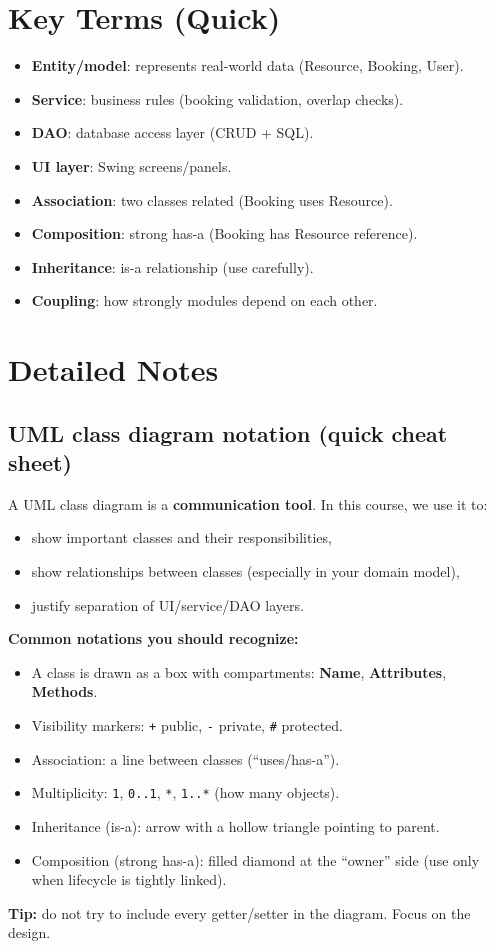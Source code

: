 \documentclass[11pt]{article}
\begin{document}
\section{Key Terms (Quick)}
\begin{itemize}
  \item \textbf{Entity/model}: represents real-world data (Resource, Booking, User).
  \item \textbf{Service}: business rules (booking validation, overlap checks).
  \item \textbf{DAO}: database access layer (CRUD + SQL).
  \item \textbf{UI layer}: Swing screens/panels.
  \item \textbf{Association}: two classes related (Booking uses Resource).
  \item \textbf{Composition}: strong has-a (Booking has Resource reference).
  \item \textbf{Inheritance}: is-a relationship (use carefully).
  \item \textbf{Coupling}: how strongly modules depend on each other.
\end{itemize}

\section{Detailed Notes}
\subsection{UML class diagram notation (quick cheat sheet)}
A UML class diagram is a \textbf{communication tool}. In this course, we use it to:
\begin{itemize}
  \item show important classes and their responsibilities,
  \item show relationships between classes (especially in your domain model),
  \item justify separation of UI/service/DAO layers.
\end{itemize}

\textbf{Common notations you should recognize:}
\begin{itemize}
  \item A class is drawn as a box with compartments: \textbf{Name}, \textbf{Attributes}, \textbf{Methods}.
  \item Visibility markers: \texttt{+} public, \texttt{-} private, \texttt{\#} protected.
  \item Association: a line between classes (``uses/has-a'').
  \item Multiplicity: \texttt{1}, \texttt{0..1}, \texttt{*}, \texttt{1..*} (how many objects).
  \item Inheritance (is-a): arrow with a hollow triangle pointing to parent.
  \item Composition (strong has-a): filled diamond at the ``owner'' side (use only when lifecycle is tightly linked).
\end{itemize}
\textbf{Tip:} do not try to include every getter/setter in the diagram. Focus on the design.
\end{document}
